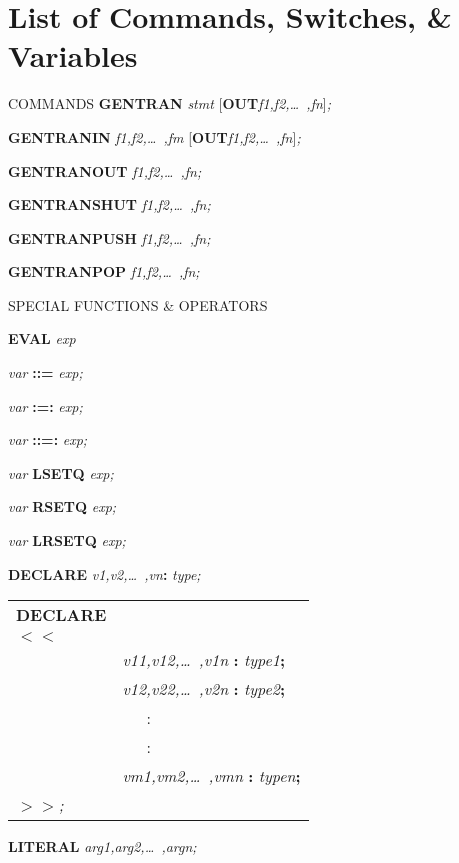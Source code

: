\section{List of Commands, Switches, \& Variables}
\label{appb}
\begin{describe}{COMMANDS}
{\bf GENTRAN} {\it stmt\/} [{\bf OUT}{\it  f1,f2,\dots\ ,fn\/}]{\it ;}

{\bf GENTRANIN} {\it f1,f2,\dots\ ,fm\/} [{\bf OUT}{\it  f1,f2,\dots\
,fn\/}]{\it ;}

{\bf GENTRANOUT} {\it f1,f2,\dots\ ,fn;}

{\bf GENTRANSHUT} {\it f1,f2,\dots\ ,fn;}

{\bf GENTRANPUSH} {\it f1,f2,\dots\ ,fn;}

{\bf GENTRANPOP} {\it f1,f2,\dots\ ,fn;}
\end{describe}

\begin{describe}{SPECIAL FUNCTIONS \& OPERATORS}

{\bf EVAL} {\it exp}

\index{::=}
{\it var} {\bf ::=} {\it exp;}

\index{:=:}
{\it var} {\bf :=:} {\it exp;}

\index{::=:}
{\it var} {\bf ::=:} {\it exp;}

{\it var} {\bf LSETQ} {\it exp;}

{\it var} {\bf RSETQ} {\it exp;}

{\it var} {\bf LRSETQ} {\it exp;}

{\bf DECLARE} {\it v1,v2,\dots\ ,vn\/}{\bf :} {\it  type;}

\begin{tabular}{ll}
{\bf DECLARE}\\
{\bf $<$$<$}\\
&{\it v11,v12,\dots\ ,v1n} {\bf :} {\it type1\/}{\bf ;}\\
&{\it v12,v22,\dots\ ,v2n} {\bf :} {\it type2\/}{\bf ;}\\
& \ \ \ :\\
& \ \ \ :\\
&{\it vm1,vm2,\dots\ ,vmn} {\bf :} {\it typen\/}{\bf ;}\\
{\bf $>$$>$}{\it ;}
\end{tabular}

{\bf LITERAL} {\it arg1,arg2,\dots\ ,argn;}
\end{describe}

